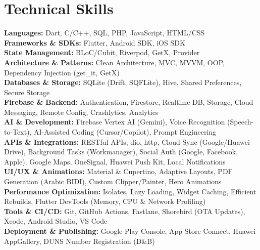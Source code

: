 \documentclass[letterpaper,11pt]{article}
\begin{document}
\section{Technical Skills}
\begin{itemize}[leftmargin=0.15in, label={}]
    \small{
        \item{
            \textbf{Languages:} Dart, C/C++, SQL, PHP, JavaScript, HTML/CSS \\
            \textbf{Frameworks \& SDKs:} Flutter, Android SDK, iOS SDK \\
            \textbf{State Management:} BLoC/Cubit, Riverpod, GetX, Provider \\
            \textbf{Architecture \& Patterns:} Clean Architecture, MVC, MVVM, OOP, Dependency Injection (get\_it, GetX) \\
            \textbf{Databases \& Storage:} SQLite (Drift, SQFLite), Hive, Shared Preferences, Secure Storage \\
            \textbf{Firebase \& Backend:} Authentication, Firestore, Realtime DB, Storage, Cloud Messaging, Remote Config, Crashlytics, Analytics \\
            \textbf{AI \& Development:} Firebase Vertex AI (Gemini), Voice Recognition (Speech-to-Text), AI-Assisted Coding (Cursor/Copilot), Prompt Engineering \\
            \textbf{APIs \& Integrations:} RESTful APIs, dio, http, Cloud Sync (Google/Huawei Drive), Background Tasks (Workmanager), Social Auth (Google, Facebook, Apple), Google Maps, OneSignal, Huawei Push Kit, Local Notifications \\
            \textbf{UI/UX \& Animations:} Material \& Cupertino, Adaptive Layouts, PDF Generation (Arabic BIDI), Custom Clipper/Painter, Hero Animations \\
            \textbf{Performance Optimization:} Isolates, Lazy Loading, Widget Caching, Efficient Rebuilds, Flutter DevTools (Memory, CPU \& Network Profiling) \\
            \textbf{Tools \& CI/CD:} Git, GitHub Actions, Fastlane, Shorebird (OTA Updates), Xcode, Android Studio, VS Code \\
            \textbf{Deployment \& Publishing:} Google Play Console, App Store Connect, Huawei AppGallery, DUNS Number Registration (D\&B)
        }
    }
\end{itemize}


\vspace{-16pt}


\end{document}
